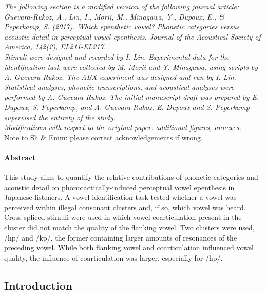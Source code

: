 \small{\textit{{\color{darkgray}The following section is a modified version of the following journal article: \\
Guevara-Rukoz, A., Lin, I., Morii, M., Minagawa, Y., Dupoux, E., \& Peperkamp, S. (2017). Which epenthetic vowel? Phonetic categories versus acoustic detail in perceptual vowel epenthesis. Journal of the Acoustical Society of America, 142(2), EL211-EL217. \\
Stimuli were designed and recorded by I. Lin.
Experimental data for the identification task were collected by M. Morii and Y. Minagawa, using scripts by A. Guevara-Rukoz. The ABX experiment was designed and run by I. Lin.
Statistical analyses, phonetic transcriptions, and acoustical analyses were performed by A. Guevara-Rukoz.
The initial manuscript draft was prepared by E. Dupoux, S. Peperkamp, and A. Guevara-Rukoz.
E. Dupoux and S. Peperkamp supervised the entirety of the study.\\
Modifications with respect to the original paper: additional figures, annexes.\\}}}
{\color{red}Note to Sh \& Emm: please correct acknowledgements if wrong.}
\paragraph{Abstract}

This study aims to quantify the relative contributions of phonetic categories and acoustic detail on phonotactically-induced perceptual vowel epenthesis in Japanese listeners. A vowel identification task tested whether a vowel was perceived within illegal consonant clusters and, if so, which vowel was heard. Cross-spliced stimuli were used in which vowel coarticulation present in the cluster did not match the quality of the flanking vowel. Two clusters were used, /hp/ and /kp/, the former containing larger amounts of resonances of the preceding vowel. While both flanking vowel and coarticulation influenced vowel quality, the influence of coarticulation was larger, especially for /hp/.

\subsection{Introduction}

\setlength{\parindent}{5ex}

